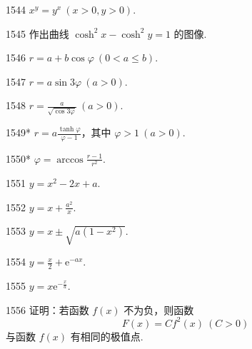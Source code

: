 \begin{prob}[S]{1544}
$x^y = y^x\ (x > 0, y > 0).$
\end{prob}

\begin{prob}[S]{1545}
作出曲线 $\cosh^2 x - \cosh^2 y = 1$ 的图像.
\end{prob}


\begin{prob}[S]{1546}
$r = a + b\cos\varphi\ (0 < a \leqslant b).$
\end{prob}

\begin{prob}[S]{1547}
$r = a\sin 3\varphi\ (a > 0).$
\end{prob}

\begin{prob}[S]{1548}
$r = \frac{a}{\sqrt{\cos 3\varphi}}\ (a > 0).$
\end{prob}

\begin{prob}[S]{1549*}
$r = a\frac{\tanh\varphi}{\varphi - 1}$，其中 $\varphi > 1\ (a > 0).$
\end{prob}

\begin{prob}[S]{1550*}
$\varphi = \arccos\frac{r - 1}{r^2}.$
\end{prob}


\begin{prob}[S]{1551}
$y = x^2 - 2x + a.$
\end{prob}

\begin{prob}[S]{1552}
$y = x + \frac{a^2}{x}.$
\end{prob}

\begin{prob}[S]{1553}
$y = x \pm \sqrt{a(1 - x^2)}.$
\end{prob}

\begin{prob}[S]{1554}
$y = \frac{x}{2} + \mathrm{e}^{-ax}.$
\end{prob}

\begin{prob}[S]{1555}
$y = x\mathrm{e}^{-\frac{x}{a}}.$
\end{prob}


\begin{prob}[M]{1556}
证明：若函数 $f(x)$ 不为负，则函数
\[
F(x) = Cf^2(x)\ (C > 0)
\]
与函数 $f(x)$ 有相同的极值点.
\end{prob}

